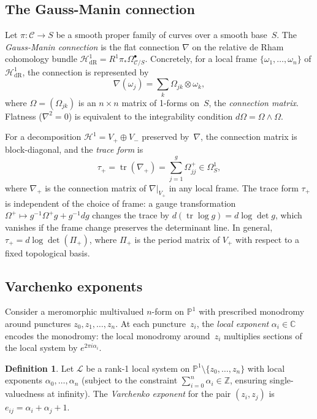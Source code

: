 \documentclass[11pt]{article}
\theoremstyle{plain}
\theoremstyle{definition}
\newtheorem{definition}[theorem]{Definition}
\theoremstyle{remark}
\newcommand{\ZZ}{\mathbb{Z}}
\newcommand{\CC}{\mathbb{C}}
\newcommand{\PP}{\mathbb{P}}
\newcommand{\tr}{\operatorname{tr}}
\begin{document}
\subsection{The Gauss-Manin connection}\label{subsec:gm}

Let $\pi : \mathcal{C} \to S$ be a smooth proper family of curves
over a smooth base~$S$.  The \emph{Gauss-Manin connection} is the
flat connection $\nabla$ on the relative de Rham cohomology bundle
$\mathcal{H}^1_{\mathrm{dR}} = R^1\pi_* \Omega^\bullet_{\mathcal{C}/S}$.
Concretely, for a local frame $\{\omega_1, \ldots, \omega_n\}$ of
$\mathcal{H}^1_{\mathrm{dR}}$, the connection is represented by
\[
  \nabla(\omega_j) = \sum_{k} \Omega_{jk} \otimes \omega_k,
\]
where $\Omega = (\Omega_{jk})$ is an $n \times n$ matrix of 1-forms on~$S$,
the \emph{connection matrix}.  Flatness ($\nabla^2 = 0$) is equivalent to the
integrability condition $d\Omega = \Omega \wedge \Omega$.

For a decomposition $\mathcal{H}^1 = V_+ \oplus V_-$ preserved
by~$\nabla$, the connection matrix is block-diagonal, and the \emph{trace form} is
\[
  \tau_+ = \tr(\nabla_+) = \sum_{j=1}^{g} \Omega^+_{jj} \in \Omega^1_S,
\]
where $\nabla_+$ is the connection matrix of $\nabla|_{V_+}$ in any local frame.
The trace form $\tau_+$ is independent of the choice of frame: a gauge transformation
$\Omega^+ \mapsto g^{-1}\Omega^+ g + g^{-1}dg$ changes the trace by
$d(\tr\log g) = d\log\det g$, which vanishes if the frame change preserves the
determinant line.  In general, $\tau_+ = d\log\det(\Pi_+)$, where $\Pi_+$ is the
period matrix of $V_+$ with respect to a fixed topological basis.

\subsection{Varchenko exponents}\label{subsec:varchenko-exp}

Consider a meromorphic multivalued $n$-form on $\PP^1$ with prescribed
monodromy around punctures $z_0, z_1, \ldots, z_n$.  At each puncture~$z_i$,
the \emph{local exponent} $\alpha_i \in \CC$ encodes the monodromy:
the local monodromy around~$z_i$ multiplies sections of the local system
by $e^{2\pi i \alpha_i}$.

\begin{definition}\label{def:varchenko-exp}
Let $\mathcal{L}$ be a rank-1 local system on $\PP^1 \setminus \{z_0, \ldots, z_n\}$
with local exponents $\alpha_0, \ldots, \alpha_n$ (subject to the constraint
$\sum_{i=0}^n \alpha_i \in \ZZ$, ensuring single-valuedness at infinity).
The \emph{Varchenko exponent} for the pair $(z_i, z_j)$ is $e_{ij} = \alpha_i + \alpha_j + 1$.
\end{definition}
\end{document}
